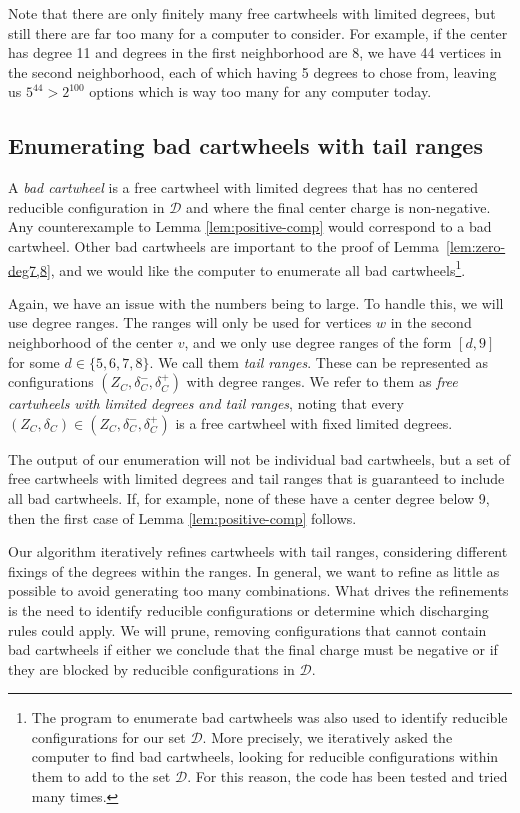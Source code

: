 \documentclass[10pt,a4paper]{article}
\def\cD{{\mathcal D}}
\begin{document}
Note that there are only finitely many free cartwheels with limited degrees, but still there are far too many for a computer to consider. For example, if the center has degree 11 and degrees in the first neighborhood are 8, we have 44 vertices in the second neighborhood, each of which having 5 degrees to chose from, leaving us $5^{44}>2^{100}$ options which is way too many for any computer today.


\subsection{Enumerating bad cartwheels with tail ranges}
\label{sub:overcharged_cartwheel_enumeration}

A \emph{bad cartwheel} is a free cartwheel with limited degrees that has no centered reducible configuration in $\cD$ and where the final center charge is non-negative. Any counterexample to Lemma \ref{lem:positive-comp} would correspond to a bad cartwheel. Other bad cartwheels are important to the proof of Lemma~\ref{lem:zero-deg7,8}, and we would like the computer to enumerate all bad cartwheels\footnote{The program to enumerate bad cartwheels was also used to identify reducible configurations for our set $\cD$. More precisely, we iteratively asked the computer to find bad cartwheels, looking for reducible configurations within them to add to the set $\cD$. For this reason, the code has been tested and tried many times.}.

Again, we have an issue with the numbers being to large. To handle this, we will use degree
ranges. The ranges will only be used for vertices $w$ in the second neighborhood of the center $v$, and we only use degree ranges
of the form $[d,9]$ for some $d \in \{5,6,7,8\}$.
We call them \emph{tail ranges}.
These can be represented as configurations $(Z_C,\delta_C^-,\delta_C^+)$ with degree ranges.
We refer to them as \emph{free cartwheels with limited degrees and tail ranges}, noting that every $(Z_C,\delta_C) \in (Z_C,\delta_C^-,\delta_C^+)$ is a free cartwheel with fixed limited degrees.

The output of our enumeration will not be individual bad cartwheels, but a set of 
free cartwheels with limited degrees and tail ranges that is guaranteed to include all bad cartwheels. If, for example, none of these have a center degree below 9, then the first case of Lemma \ref{lem:positive-comp} follows.

Our algorithm iteratively refines cartwheels with tail ranges, considering different fixings of the degrees within the ranges. In general, we want to refine as little as possible to avoid generating too many combinations.
What drives the refinements is the need to identify reducible configurations or determine which discharging rules could apply. We will prune, removing configurations 
that cannot contain bad cartwheels if either we conclude that the final charge must be negative or if they are blocked by reducible configurations in $\mathcal{D}$.
\end{document}
